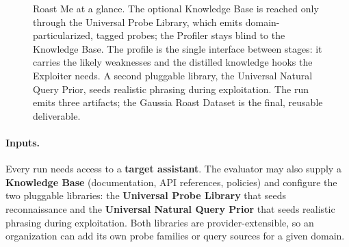 \documentclass[11pt,a4paper]{article}
\begin{document}
\begin{figure}[ht]
\caption{Roast Me at a glance. The optional Knowledge Base is reached only
through the Universal Probe Library, which emits domain-particularized,
tagged probes; the Profiler stays blind to the Knowledge Base. The profile is
the single interface between stages: it carries the likely weaknesses and the
distilled knowledge hooks the Exploiter needs. A second pluggable library, the
Universal Natural Query Prior, seeds realistic phrasing during exploitation. The
run emits three artifacts; the Gaussia Roast Dataset is the final, reusable
deliverable.}
\label{fig:overview}
\end{figure}

\paragraph{Inputs.}
Every run needs access to a \textbf{target assistant}. The evaluator may also
supply a \textbf{Knowledge Base} (documentation, API references, policies) and
configure the two pluggable libraries: the \textbf{Universal Probe Library} that
seeds reconnaissance and the \textbf{Universal Natural Query Prior} that seeds
realistic phrasing during exploitation. Both libraries are provider-extensible,
so an organization can add its own probe families or query sources for a given
domain.
\end{document}
